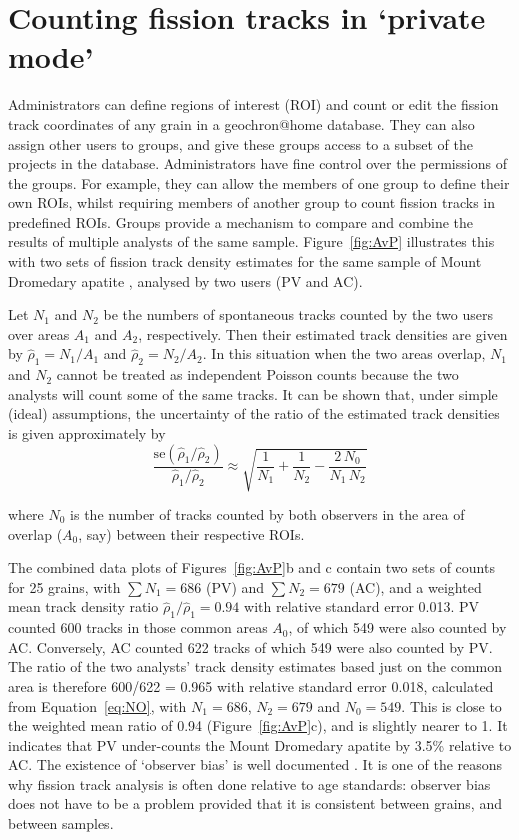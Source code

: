 \documentclass[gchron, manuscript]{copernicus}
\begin{document}
\section{Counting fission tracks in `private mode'}\label{sec:private}

Administrators can define regions of interest (ROI) and count or edit
the fission track coordinates of any grain in a geochron@home
database. They can also assign other users to groups, and give these
groups access to a subset of the projects in the
database. Administrators have fine control over the permissions of the
groups. For example, they can allow the members of one group to define
their own ROIs, whilst requiring members of another group to count
fission tracks in predefined ROIs.  Groups provide a mechanism to
compare and combine the results of multiple analysts of the same
sample. Figure~\ref{fig:AvP} illustrates this with two sets of fission
track density estimates for the same sample of Mount Dromedary apatite
\citep{green1985b}, analysed by two users (PV and AC).\medskip

Let $N_1$ and $N_2$ be the numbers of spontaneous tracks counted by
the two users over areas $A_1$ and $A_2$, respectively. Then their
estimated track densities are given by $\hat{\rho}_1 = N_1/A_1$ and
$\hat{\rho}_2 = N_2/A_2$. In this situation when the two areas
overlap, $N_1$ and $N_2$ cannot be treated as independent Poisson
counts because the two analysts will count some of the same tracks. It
can be shown that, under simple (ideal) assumptions, the uncertainty
of the ratio of the estimated track densities is given approximately
by
\begin{equation}
  \frac{\mbox{se}(\hat{\rho}_1/\hat{\rho}_2)}{\hat{\rho}_1/\hat{\rho}_2} \approx
  \sqrt{ \frac{1}{N_1} + \frac{1}{N_2} - \frac{2\,N_0}{N_1\,N_2} }
  \label{eq:NO}
\end{equation}

\noindent where $N_0$ is the number of tracks counted by both
observers in the area of overlap ($A_0$, say) between their respective
ROIs.\medskip 

The combined data plots of Figures~\ref{fig:AvP}b and c contain two
sets of counts for 25 grains, with $\sum N_{1} = 686$ (PV) and $\sum
N_{2} = 679$ (AC), and a weighted mean track density ratio
$\hat{\rho}_{1}/\hat{\rho}_{1} = 0.94$ with relative standard error
0.013. PV counted 600 tracks in those common areas $A_0$, of which 549
were also counted by AC. Conversely, AC counted 622 tracks of which
549 were also counted by PV. The ratio of the two analysts' track
density estimates based just on the common area is therefore 600/622 =
0.965 with relative standard error 0.018, calculated from
Equation~\ref{eq:NO}, with $N_1 = 686$, $N_2 = 679$ and $N_0 = 549$.
This is close to the weighted mean ratio of 0.94
(Figure~\ref{fig:AvP}c), and is slightly nearer to 1. It indicates
that PV under-counts the Mount Dromedary apatite by 3.5\% relative to
AC.  The existence of `observer bias' is well documented
\citep{tamer2025}.  It is one of the reasons why fission track
analysis is often done relative to age standards: observer bias does
not have to be a problem provided that it is consistent between
grains, and between samples.\medskip
\end{document}
